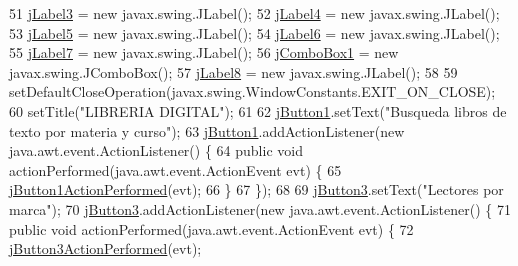 \begin{DoxyCode}
51         \mbox{\hyperlink{class_interfaz_package_1_1_consulta_busqueda_ac2ce384e0d5b1405b8a3cfec2683a020}{jLabel3}} = \textcolor{keyword}{new} javax.swing.JLabel();
52         \mbox{\hyperlink{class_interfaz_package_1_1_consulta_busqueda_a2b841f08ba3d614049012b4b67130909}{jLabel4}} = \textcolor{keyword}{new} javax.swing.JLabel();
53         \mbox{\hyperlink{class_interfaz_package_1_1_consulta_busqueda_aa93cd22be90131fea76b2a1b2f113b9b}{jLabel5}} = \textcolor{keyword}{new} javax.swing.JLabel();
54         \mbox{\hyperlink{class_interfaz_package_1_1_consulta_busqueda_ab5f2ed2b4cd6da7ed4e68ab08caabf65}{jLabel6}} = \textcolor{keyword}{new} javax.swing.JLabel();
55         \mbox{\hyperlink{class_interfaz_package_1_1_consulta_busqueda_a999fbcac6f0a6a7bfc57c17612ea2605}{jLabel7}} = \textcolor{keyword}{new} javax.swing.JLabel();
56         \mbox{\hyperlink{class_interfaz_package_1_1_consulta_busqueda_ab0737507a855f158ca16439d3df67b4e}{jComboBox1}} = \textcolor{keyword}{new} javax.swing.JComboBox();
57         \mbox{\hyperlink{class_interfaz_package_1_1_consulta_busqueda_ade14e21c50a0fe22a685656e3815a253}{jLabel8}} = \textcolor{keyword}{new} javax.swing.JLabel();
58 
59         setDefaultCloseOperation(javax.swing.WindowConstants.EXIT\_ON\_CLOSE);
60         setTitle(\textcolor{stringliteral}{"LIBRERIA DIGITAL"});
61 
62         \mbox{\hyperlink{class_interfaz_package_1_1_consulta_busqueda_a8cbb600ad394d0017b1f7fd24090eae5}{jButton1}}.setText(\textcolor{stringliteral}{"Busqueda libros de texto por materia y curso"});
63         \mbox{\hyperlink{class_interfaz_package_1_1_consulta_busqueda_a8cbb600ad394d0017b1f7fd24090eae5}{jButton1}}.addActionListener(\textcolor{keyword}{new} java.awt.event.ActionListener() \{
64             \textcolor{keyword}{public} \textcolor{keywordtype}{void} actionPerformed(java.awt.event.ActionEvent evt) \{
65                 \mbox{\hyperlink{class_interfaz_package_1_1_consulta_busqueda_ab7479eeeb30a47204e0ce5435b2943f4}{jButton1ActionPerformed}}(evt);
66             \}
67         \});
68 
69         \mbox{\hyperlink{class_interfaz_package_1_1_consulta_busqueda_ad28b7024dc55d1785ac611b91dab6030}{jButton3}}.setText(\textcolor{stringliteral}{"Lectores por marca"});
70         \mbox{\hyperlink{class_interfaz_package_1_1_consulta_busqueda_ad28b7024dc55d1785ac611b91dab6030}{jButton3}}.addActionListener(\textcolor{keyword}{new} java.awt.event.ActionListener() \{
71             \textcolor{keyword}{public} \textcolor{keywordtype}{void} actionPerformed(java.awt.event.ActionEvent evt) \{
72                 \mbox{\hyperlink{class_interfaz_package_1_1_consulta_busqueda_aefe90b6a93c1980740aba8de6f1f137f}{jButton3ActionPerformed}}(evt);

\end{DoxyCode}
